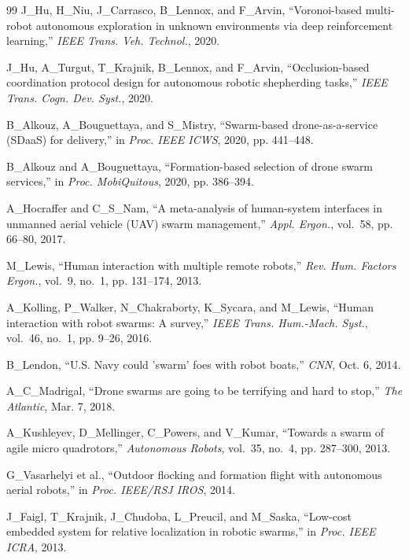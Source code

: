 \documentclass[letterpaper, 10pt, conference]{IEEEtran}
\begin{document}
\begin{thebibliography}{99}
J\_Hu, H\_Niu, J\_Carrasco, B\_Lennox, and F\_Arvin, ``Voronoi-based multi-robot autonomous exploration in unknown environments via deep reinforcement learning,'' \emph{IEEE Trans. Veh. Technol.}, 2020.

J\_Hu, A\_Turgut, T\_Krajnik, B\_Lennox, and F\_Arvin, ``Occlusion-based coordination protocol design for autonomous robotic shepherding tasks,'' \emph{IEEE Trans. Cogn. Dev. Syst.}, 2020.

B\_Alkouz, A\_Bouguettaya, and S\_Mistry, ``Swarm-based drone-as-a-service ({SDaaS}) for delivery,'' in \emph{Proc. IEEE ICWS}, 2020, pp. 441--448.

B\_Alkouz and A\_Bouguettaya, ``Formation-based selection of drone swarm services,'' in \emph{Proc. MobiQuitous}, 2020, pp. 386--394.

A\_Hocraffer and C\_S\_Nam, ``A meta-analysis of human-system interfaces in unmanned aerial vehicle ({UAV}) swarm management,'' \emph{Appl. Ergon.}, vol.~58, pp. 66--80, 2017.

M\_Lewis, ``Human interaction with multiple remote robots,'' \emph{Rev. Hum. Factors Ergon.}, vol.~9, no.~1, pp. 131--174, 2013.

A\_Kolling, P\_Walker, N\_Chakraborty, K\_Sycara, and M\_Lewis, ``Human interaction with robot swarms: A survey,'' \emph{IEEE Trans. Hum.-Mach. Syst.}, vol.~46, no.~1, pp. 9--26, 2016.

B\_Lendon, ``{U.S.} Navy could 'swarm' foes with robot boats,'' \emph{CNN}, Oct. 6, 2014.

A\_C\_Madrigal, ``Drone swarms are going to be terrifying and hard to stop,'' \emph{The Atlantic}, Mar. 7, 2018.

A\_Kushleyev, D\_Mellinger, C\_Powers, and V\_Kumar, ``Towards a swarm of agile micro quadrotors,'' \emph{Autonomous Robots}, vol.~35, no.~4, pp. 287--300, 2013.

G\_Vasarhelyi et al., ``Outdoor flocking and formation flight with autonomous aerial robots,'' in \emph{Proc. IEEE/RSJ IROS}, 2014.

J\_Faigl, T\_Krajnik, J\_Chudoba, L\_Preucil, and M\_Saska, ``Low-cost embedded system for relative localization in robotic swarms,'' in \emph{Proc. IEEE ICRA}, 2013.


\end{thebibliography}
\end{document}
